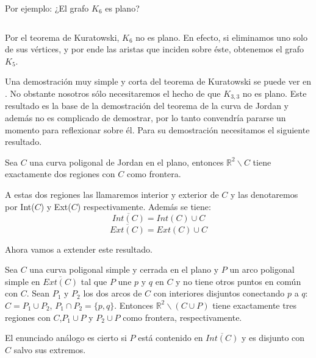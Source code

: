 Por ejemplo: ¿El grafo $K_6$ es plano?
\[\]
\[\]
	
	Por el teorema de Kuratowski, $K_{6}$ no es plano. En efecto, si eliminamos uno solo de sus vértices, y por ende las aristas que inciden sobre éste, obtenemos el grafo $K_5$.
	
	Una demostración muy simple y corta del teorema de Kuratowski se puede ver en \cite{Kuratowski}. No obstante nosotros sólo necesitaremos el hecho de que $K_{3,3}$ no es plano.
	Este resultado es la base de la demostración del teorema de la curva de Jordan y además no es complicado de demostrar, por lo tanto convendría pararse un momento para reflexionar sobre él. Para su demostración necesitamos el siguiente resultado.
	
\begin{lemma}
	Sea $C$ una curva poligonal de Jordan en el plano, entonces $\mathbb{R}^2 \backslash C$ tiene exactamente dos regiones con $C$ como frontera.
\end{lemma}

	A estas dos regiones las llamaremos interior y exterior de $C$ y las denotaremos por Int($C$) y Ext($C$) respectivamente. Además se tiene:
\[
\overline{Int(C)} = Int(C) \cup C
\]
\[
\overline{Ext(C)} = Ext(C) \cup C
\]

Ahora vamos a extender este resultado.

\begin{lemma}\label{lema24}
	Sea $C$ una curva poligonal simple y cerrada en el plano y $P$ un arco poligonal simple en $\overline{Ext(C)}$ tal que $P$ une $p$ y $q$ en $C$ y no tiene otros puntos en común con $C$. Sean $P_1$ y $P_2$ los dos arcos de $C$ con interiores disjuntos conectando $p$ a $q$: $C=P_1\cup P_2$, $P_1\cap P_2=\{p,q\}$. Entonces $\mathbb{R}^2 \backslash (C \cup P)$ tiene exactamente tres regiones con $C$,$P_{1} \cup P$ y $P_{2} \cup P$ como frontera, respectivamente.
	
El enunciado análogo es cierto si $P$ está contenido en  $\overline{Int(C)}$ y es disjunto con $C$ salvo sus extremos.
\end{lemma}


